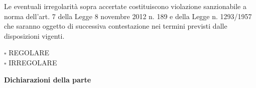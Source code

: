 \documentclass[12pt]{article}
\begin{document}
Le eventuali irregolarità sopra accertate costituiscono violazione sanzionabile a norma dell’art. 7 della Legge 8 novembre 2012 n. 189 e della Legge n. 1293/1957 che saranno oggetto di successiva contestazione nei termini previsti dalle disposizioni vigenti.
\begin{multicols}{2}
    \begin{math}\square\end{math} REGOLARE \\
    \begin{math}\square\end{math} IRREGOLARE
\end{multicols}








\begin{center}
    \textbf{Dichiarazioni della parte}
\end{center}
\end{document}

